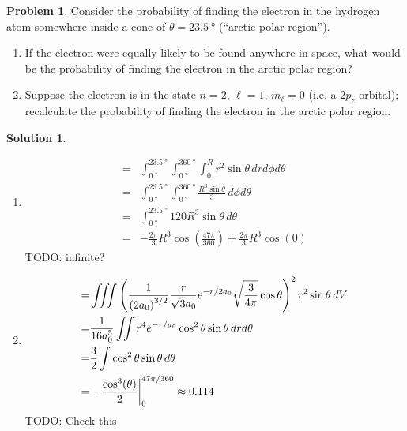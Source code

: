 \documentclass[10pt]{article}
\theoremstyle{definition}
\newtheorem{problem}{Problem}
\newtheorem{soln}{Solution}
\begin{document}
\begin{problem}
Consider the probability of finding the electron in the hydrogen atom somewhere inside a cone of $\theta=\qty{23.5}{\degree}$
(``arctic polar region'').
\begin{enumerate}[label=(\alph*)]
  \item If the electron were equally likely to be found anywhere in space, what would be the probability of finding the
        electron in the arctic polar region?
  \item Suppose the electron is in the state $n = 2$, $\ell = 1$, $m_\ell = 0$ (i.e. a $2p_z$ orbital); recalculate the probability of
        finding the electron in the arctic polar region.
\end{enumerate}
\end{problem}
\begin{soln}
  \begin{enumerate}[label=(\alph*)]
    \item \begin{align*}
            = & \int_{\qty{0}{\degree}}^{\qty{23.5}{\degree}}\int_{\qty{0}{\degree}}^{\qty{360}{\degree}}\int_0^R r^2\sin\theta\,dr d\phi d\theta \\
            = & \int_{\qty{0}{\degree}}^{\qty{23.5}{\degree}}\int_{\qty{0}{\degree}}^{\qty{360}{\degree}} \frac{R^3\sin\theta}{3}\, d\phi d\theta \\
            = & \int_{\qty{0}{\degree}}^{\qty{23.5}{\degree}}120R^3\sin\theta\,  d\theta                                                          \\
            = & -\frac{2\pi}{3}R^3\cos\left(\frac{47\pi}{360}\right)+\frac{2\pi}{3}R^3\cos\left(0\right)
          \end{align*}
          TODO: infinite?
    \item \begin{align*}
            = & \iiint \left(\frac{1}{\left(2a_0\right)^{3/2}}\frac{r}{\sqrt{3}a_0}e^{-r/2a_0}\sqrt{\frac{3}{4\pi}}\cos\theta\right)^2r^2\sin\theta\,dV \\
            = & \frac{1}{16a_0^5}\iint r^4e^{-r/a_0}\cos^2\theta\sin\theta\,dr d\theta                                                                  \\
            = & \frac{3}{2}\int \cos^2\theta\sin\theta\,d\theta                                                                                         \\
            = & \eval{-\frac{\cos^3(\theta)}{2}}_{0}^{47\pi/360}\approx 0.114
          \end{align*}
          TODO: Check this
  \end{enumerate}
\end{soln}
\end{document}
